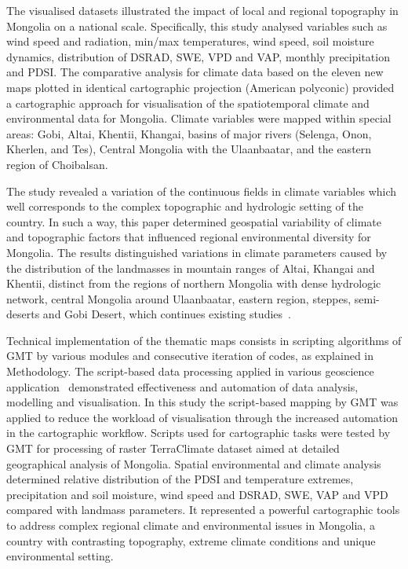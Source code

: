 \documentclass[geosciences,article,accept,pdftex,oneauthor]{Definitions/mdpi}
\begin{document}
The visualised datasets illustrated the impact of local and regional topography in Mongolia on a national scale. Specifically, this study analysed variables such as wind speed and radiation, min/max temperatures, wind speed, soil moisture dynamics, distribution of DSRAD, SWE, VPD and VAP, monthly precipitation and PDSI. The comparative analysis for climate data based on the eleven new maps plotted in identical cartographic projection (American polyconic) provided a cartographic approach for visualisation of the spatiotemporal climate and environmental data for Mongolia. Climate variables were mapped within special areas: Gobi, Altai, Khentii, Khangai, basins of major rivers (Selenga, Onon, Kherlen, and Tes), Central Mongolia with the Ulaanbaatar, and the eastern region of Choibalsan.

The study revealed a variation of the continuous fields in climate variables which well corresponds to the complex topographic and hydrologic setting of the country. In such a way, this paper determined geospatial variability of climate and topographic factors that influenced regional environmental diversity for Mongolia. The results distinguished variations in climate parameters caused by the distribution of the landmasses in mountain ranges of Altai, Khangai and Khentii, distinct from the regions of northern Mongolia with dense hydrologic network, central Mongolia around Ulaanbaatar, eastern region, steppes, semi-deserts and Gobi Desert, which continues existing studies~\cite{Cook,Ulaankhuu}. 

Technical implementation of the thematic maps consists in scripting algorithms of GMT by various modules and consecutive iteration of codes, as explained in Methodology. The script-based data processing applied in various geoscience application~\cite{Lemenkova2019c,Lemenkov2021} demonstrated effectiveness and automation of data analysis, modelling and visualisation. In this study the script-based mapping by GMT was applied to reduce the workload of visualisation through the increased automation in the cartographic workflow. Scripts used for cartographic tasks were tested by GMT for processing of raster TerraClimate dataset aimed at detailed geographical analysis of Mongolia. Spatial environmental and climate analysis determined relative distribution of the PDSI and temperature extremes, precipitation and soil moisture, wind speed and DSRAD, SWE, VAP and VPD compared with landmass parameters. It represented a powerful cartographic tools to address complex regional climate and environmental issues in Mongolia, a country with contrasting topography, extreme climate conditions and unique environmental setting. 
\end{document}
